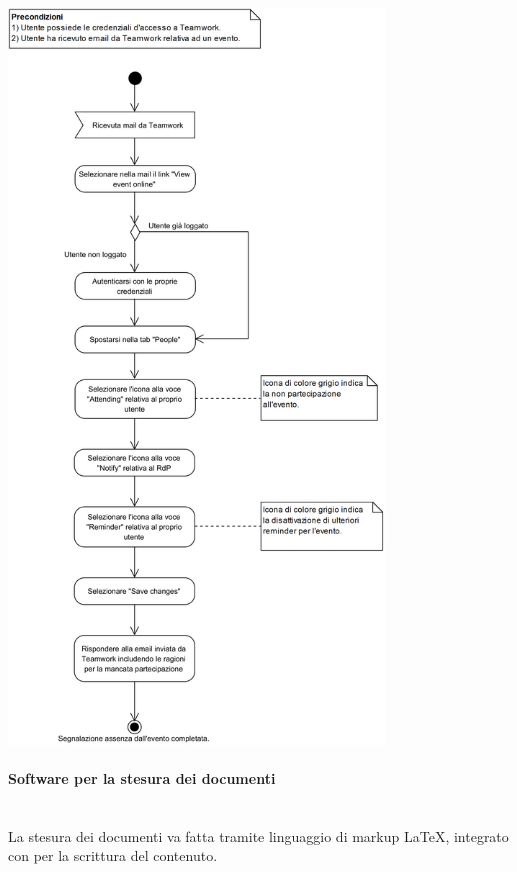 \begin{samepage}
	\mbox{}\\
	
	\begin{center}
		\includegraphics[width=10cm]{../../documenti/NormeDiProgetto/DiagrammiProcedure/SegnalazioneAssenzaDaUnEvento.png}
	\end{center}
	
\end{samepage}

\paragraph{Software per la stesura dei documenti}\mbox{}\\
La stesura dei documenti va fatta tramite linguaggio di markup \LaTeX{}, integrato con  per la scrittura del contenuto. 

